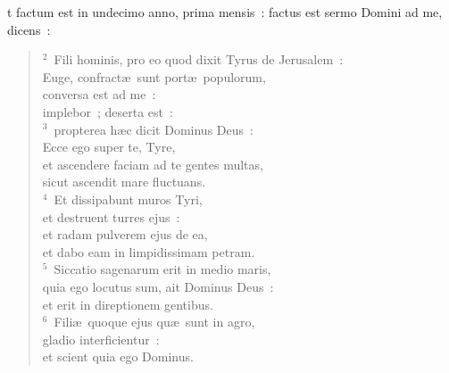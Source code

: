 \bchapter
{}t factum est in undecimo anno, prima mensis~: factus est sermo Domini ad me, dicens~:
\begin{flushleft}\begin{verse}\vspace{6pt}${}^{2}$~Fili hominis, pro eo quod dixit Tyrus de Jerusalem~:\\ Euge, confract\ae\ sunt port\ae\ populorum,\\ conversa est ad me~:\\ implebor~; deserta est~:\\
${}^{3}$~propterea h\ae c dicit Dominus Deus~:\\ Ecce ego super te, Tyre,\\ et ascendere faciam ad te gentes multas,\\ sicut ascendit mare fluctuans.\\
${}^{4}$~Et dissipabunt muros Tyri,\\ et destruent turres ejus~:\\ et radam pulverem ejus de ea,\\ et dabo eam in limpidissimam petram.\\
${}^{5}$~Siccatio sagenarum erit in medio maris,\\ quia ego locutus sum, ait Dominus Deus~:\\ et erit in direptionem gentibus.\\
${}^{6}$~Fili\ae\ quoque ejus qu\ae\ sunt in agro,\\ gladio interficientur~:\\ et scient quia ego Dominus.\end{verse}\end{flushleft}


